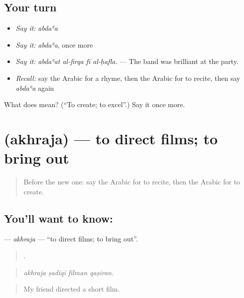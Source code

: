 \subsection*{Your turn}
\begin{itemize}
\raggedright
  \item \emph{Say it:} \emph{abdaʿa}
  \item \emph{Say it:} \emph{abdaʿa}, once more
  \item \emph{Say it:} \emph{abdaʿat al-firqa fī al-ḥafla.} — The band was brilliant at the party.
  \item \emph{Recall:} say the Arabic for a rhyme, then the Arabic for to recite, then say \emph{abdaʿa} again
\end{itemize}

\begin{tcolorbox}[breakable,colback=teal!4,colframe=teal!35!black,title={Before you move on}]
What does  mean? (\textquotedblleft{}To create; to excel\textquotedblright{}.) Say it once more.
\end{tcolorbox}
\section[\texorpdfstring{\ar{أخرج} (akhraja)}{أخرج (akhraja)}]{ (akhraja) — to direct films; to bring out}

\label{lesson:AR-C545-akhraja}



\begin{quote}
Before the new one: say the Arabic for to recite, then the Arabic for to create.
\end{quote}

\subsection*{You'll want to know: }
\textbf{} — \emph{akhraja} — \textquotedblleft{}to direct films; to bring out\textquotedblright{}.

\begin{quote}
   .
\end{quote}

\begin{quote}
\emph{akhraja ṣadīqī fīlman qaṣīran.}
\end{quote}

\begin{quote}
My friend directed a short film.
\end{quote}

